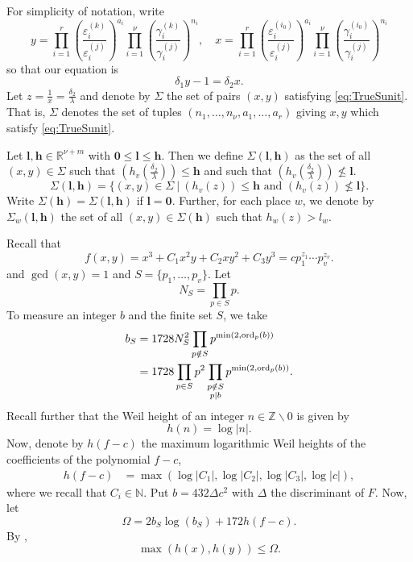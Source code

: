 For simplicity of notation, write
\[y =  \prod_{i = 1}^r\left( \frac{\varepsilon_i^{(k)}}{\varepsilon_i^{(j)}}\right)^{a_i}\prod_{i = 1}^{\nu} \left( \frac{\gamma_i^{(k)}}{\gamma_i^{(j)}}\right)^{n_i}, \quad 
x = \prod_{i = 1}^{r}\left( \frac{\varepsilon_i^{(i_0)}}{\varepsilon_i^{(j)}}\right)^{a_i} \prod_{i = 1}^{\nu} \left( \frac{\gamma_i^{(i_0)}}{\gamma_i^{(j)}}\right)^{n_i}\]
so that our equation is
\begin{equation} \label{eq:TrueSunit}
\delta_1y - 1 = \delta_2x.
\end{equation}
Let $z= \frac{1}{x} = \frac{\delta_2}{\lambda}$ and denote by $\Sigma$ the set of pairs $(x,y)$ satisfying \eqref{eq:TrueSunit}. That is, $\Sigma$ denotes the set of tuples $(n_1, \dots, n_{\nu}, a_1, \dots, a_r)$ giving $x,y$ which satisfy \eqref{eq:TrueSunit}.

Let $\mathbf{l},\mathbf{h}\in\mathbb{R}^{\nu + m}$ with $\mathbf{0}\leq \mathbf{l}\leq \mathbf{h}$. Then we define $\Sigma(\mathbf{l},\mathbf{h})$ as the set of all $(x,y)\in \Sigma$ such that $\left(h_v\left(\frac{\delta_2}{\lambda}\right)\right)\leq \mathbf{h}$ and such that $\left(h_v\left(\frac{\delta_2}{\lambda}\right)\right)\nleq \mathbf{l}$. 
\[\Sigma(\mathbf{l},\mathbf{h}) = \{(x,y) \in \Sigma \ | \ (h_v(z))\leq \mathbf{h} \text{ and } (h_v(z))\nleq \mathbf{l}\}.\]
Write $\Sigma(\mathbf{h})=\Sigma(\mathbf{l},\mathbf{h})$ if $\mathbf{l}=\mathbf{0}$. Further, for each place $w$, we denote by $\Sigma_w(\mathbf{l},\mathbf{h})$ the set of all $(x,y)\in\Sigma(\mathbf{h})$ such that $h_w(z)>l_w$. 

Recall that 
\[f(x,y) = x^3 + C_1 x^{2}y + C_2xy^2 + C_3y^3 = c p_1^{z_1} \cdots p_v^{z_v}.\]
and $\gcd(x,y)=1$ and $S = \{p_1, \dots, p_v\}$. Let 
\[N_S = \prod_{p\in S}p.\]
To measure an integer $b$ and the finite set $S$, we take
\begin{align*}
b_S	& = 1728 N_S^2 \prod_{p \notin S} p^{\min(2,\operatorname{ord}_p(b))}\\
	& = 1728 \prod_{p\in S}p^2 \prod_{\substack{p \notin S \\ p \mid b}} p^{\min(2,\operatorname{ord}_p(b))}.
\end{align*}
Recall further that the Weil height of an integer $n \in \mathbb{Z}\backslash {0}$ is given by
\[h(n) = \log|n|.\] 
Now, denote by $h(f-c)$ the maximum logarithmic Weil heights of the coefficients of the polynomial $f - c$,
\begin{align*}
h(f-c) & = \max(\log|C_1|, \log|C_2|, \log|C_3|, \log|c|),		
\end{align*}
where we recall that $C_i \in \mathbb{N}$.
Put $b = 432 \Delta c^2$ with $\Delta$ the discriminant of $F$. Now, let 
\[\Omega = 2b_S \log(b_S) + 172h(f-c).\]
By , 
\[\max(h(x),h(y))\leq \Omega. \]

